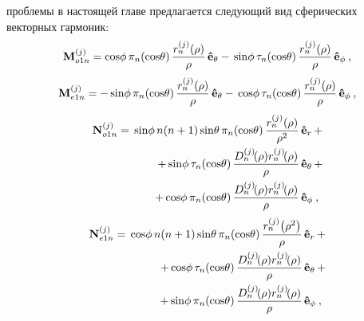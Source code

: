 проблемы в настоящей главе предлагается следующий вид сферических
векторных гармоник:
\begin{equation}
  \label{eq:2p1mod}
 \begin{alignedat}{2}
  {\rm\mathbf{M}}_{o1n}^{(j)} ={\rm cos} \phi\,
         \pi_n\!\left({\rm  cos} \theta\right)
         \frac{r_n^{(j)}\!\left( \rho \right)}{\rho}\,
         {\boldsymbol{\hat{\rm e}}}_{\theta}   
-\,{\rm sin} \phi\,
         \tau_n\!\left({\rm  cos} \theta\right)
         \frac{r_n^{(j)}\!\left( \rho \right)}{\rho}\,
         &{\boldsymbol{\hat{\rm e}}}_{\phi}\:,
 \end{alignedat}
\end{equation}
%
\begin{equation}
 \begin{alignedat}{2}
  {\rm\mathbf{M}}_{e1n}^{(j)} =-\,{\rm sin} \phi\,
         \pi_n\!\left({\rm  cos} \theta\right)
         \frac{r_n^{(j)}\!\left( \rho \right)}{\rho}\,
         {\boldsymbol{\hat{\rm e}}}_{\theta}   
-\, {\rm cos} \phi\,
         \tau_n\!\left({\rm  cos} \theta\right)
         \frac{r_n^{(j)}\!\left( \rho \right)}{\rho}\,
         &{\boldsymbol{\hat{\rm e}}}_{\phi}\:,
 \end{alignedat}
\end{equation}
%
\begin{equation}
 \begin{alignedat}{2}
{\rm \mathbf{N}}_{o1n}^{(j)} = \,{\rm sin} \phi\,n\!\left(n+1\right)
         {\rm sin}\theta\,
         \pi_n\!\left({\rm  cos} \theta\right)
         \frac{
           r_n^{(j)}\!\left( \rho \right)
              }{\rho^2}\,
           &{\boldsymbol{\hat{\rm e}}}_{r}\,+   \\
+\,
{\rm sin} \phi\,
         \tau_n\!\left({\rm  cos} \theta\right)
         \frac{
           D_n^{(j)}\!(\rho) r_n^{(j)}\!(\rho)
              }{\rho}\,
            &{\boldsymbol{\hat{\rm e}}}_{\theta}\,+   \\
+\,
{\rm cos} \phi\,
         \pi_n\!\left({\rm  cos} \theta\right)
         \frac{
           D_n^{(j)}\!(\rho) r_n^{(j)}\!(\rho)
              }{\rho}\,
            &{\boldsymbol{\hat{\rm e}}}_{\phi}\:,
\end{alignedat}
\end{equation}
%
\begin{equation}
 \begin{alignedat}{2}
{\rm \mathbf{N}}_{e1n}^{(j)} = \,{\rm cos} \phi\,n\!\left(n+1\right)
         {\rm sin}\theta\,
         \pi_n\!\left({\rm  cos} \theta\right)
         \frac{
               r_n^{(j)}\!\left( \rho^2 \right)
              }{\rho}\,
           &{\boldsymbol{\hat{\rm e}}}_{r}\,+   \\
+\,
{\rm cos} \phi\,
         \tau_n\!\left({\rm  cos} \theta\right)
         \frac{
           D_n^{(j)}\!(\rho) r_n^{(j)}\!(\rho)
              }{\rho}\,
            &{\boldsymbol{\hat{\rm e}}}_{\theta}\,+   \\
+\,
{\rm sin} \phi\,
         \pi_n\!\left({\rm  cos} \theta\right)
         \frac{
           D_n^{(j)}\!(\rho) r_n^{(j)}\!(\rho)
              }{\rho}\,
            &{\boldsymbol{\hat{\rm e}}}_{\phi}\:,
\end{alignedat}
\end{equation}
